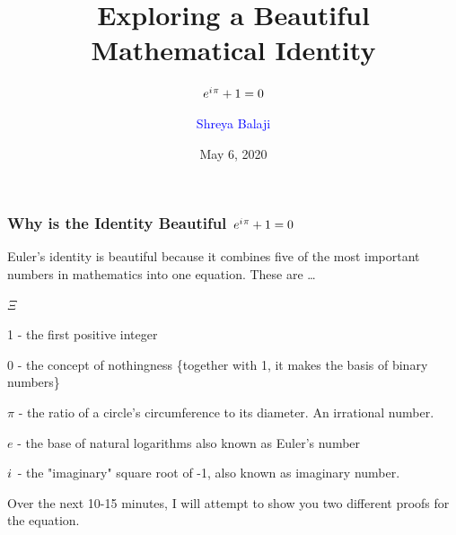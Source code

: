 \documentclass[10pt]{beamer}
\newcommand{\iu}{{i\mkern1mu}}
\begin{document}
\author{\Large\textcolor{blue}{Shreya Balaji}}
\title{Exploring a Beautiful Mathematical Identity}
\subtitle{\huge\(e^{\iu \pi} +1 = 0\)}
\date{May 6, 2020}


\begin{frame}[plain]
	\maketitle
\end{frame}

\begin{frame}
	\frametitle{Why is the Identity Beautiful \hspace{25pt} \textcolor{pink}{\Huge\(e^{\iu \pi} + 1 =0\)}}
	
	Euler's identity is beautiful because it combines five of the most important numbers in mathematics into one equation. These are \dots
	\begin{list}{$\Xi$}{}
	\item 1 - the first positive integer
	\item 0 - the concept of nothingness \{together with 1, it makes the basis of binary numbers\}
	\item {\bf${\pi}$} - the ratio of a circle's circumference to its diameter. An irrational number.
	\item $e$ - the base of natural logarithms also known as Euler's number
	\item $\iu$ - the "imaginary" square root of -1, also known as imaginary number.
	\end{list}
\vspace{20pt}
Over the next 10-15 minutes, I will attempt to show you two different proofs for the equation.
	
\end{frame}
\end{document}
